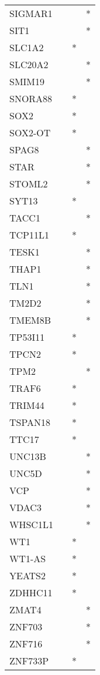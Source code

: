 \begin{longtable}{lccc}
SIGMAR1       &       &    &       * \\
SIT1          &       &    &       * \\
SLC1A2        &       &  * &         \\
SLC20A2       &       &    &       * \\
SMIM19        &       &    &       * \\
SNORA88       &       &  * &         \\
SOX2          &       &  * &         \\
SOX2-OT       &       &  * &         \\
SPAG8         &       &    &       * \\
STAR          &       &    &       * \\
STOML2        &       &    &       * \\
SYT13         &       &  * &         \\
TACC1         &       &    &       * \\
TCP11L1       &       &  * &         \\
TESK1         &       &    &       * \\
THAP1         &       &    &       * \\
TLN1          &       &    &       * \\
TM2D2         &       &    &       * \\
TMEM8B        &       &    &       * \\
TP53I11       &       &  * &         \\
TPCN2         &       &  * &         \\
TPM2          &       &    &       * \\
TRAF6         &       &  * &         \\
TRIM44        &       &  * &         \\
TSPAN18       &       &  * &         \\
TTC17         &       &  * &         \\
UNC13B        &       &    &       * \\
UNC5D         &       &    &       * \\
VCP           &       &    &       * \\
VDAC3         &       &    &       * \\
WHSC1L1       &       &    &       * \\
WT1           &       &  * &         \\
WT1-AS        &       &  * &         \\
YEATS2        &       &  * &         \\
ZDHHC11       &       &  * &         \\
ZMAT4         &       &    &       * \\
ZNF703        &       &    &       * \\
ZNF716        &       &    &       * \\
ZNF733P       &       &  * &         \\
\end{longtable}
